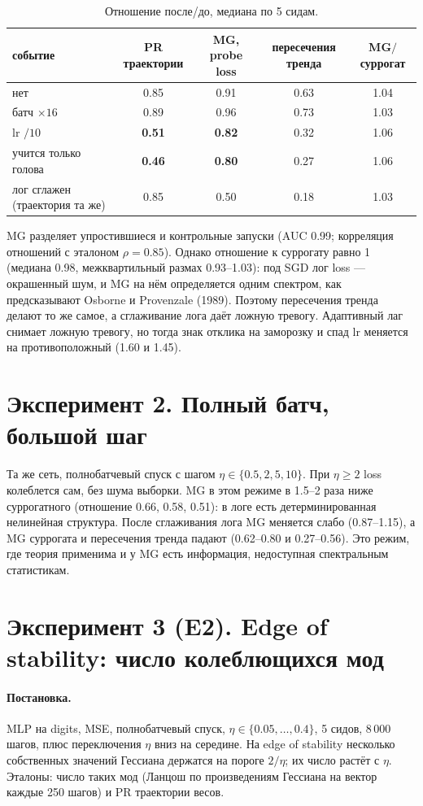 \documentclass[10pt,a4paper]{article}
\newcommand{\bad}[1]{\textcolor[HTML]{BB5566}{#1}}
\begin{document}
\begin{table}[h]\centering\small
\begin{tabular}{lcccc}\toprule
событие & PR траектории & MG, probe loss & пересечения тренда & MG$/$суррогат\\\midrule
нет & 0.85 & 0.91 & 0.63 & 1.04\\
батч $\times16$ & 0.89 & 0.96 & 0.73 & 1.03\\
lr $/10$ & \textbf{0.51} & \textbf{0.82} & 0.32 & 1.06\\
учится только голова & \textbf{0.46} & \textbf{0.80} & 0.27 & 1.06\\
лог сглажен (траектория та же) & 0.85 & \bad{0.50} & 0.18 & 1.03\\
\bottomrule\end{tabular}
\caption{Отношение после/до, медиана по 5 сидам.}\end{table}

MG разделяет упростившиеся и контрольные запуски (AUC 0.99; корреляция отношений с
эталоном $\rho=0.85$). Однако отношение к суррогату равно 1 (медиана 0.98,
межквартильный размах 0.93--1.03): под SGD лог loss --- окрашенный шум, и MG на нём
определяется одним спектром, как предсказывают Osborne и Provenzale (1989). Поэтому
пересечения тренда делают то же самое, а сглаживание лога даёт ложную тревогу.
Адаптивный лаг снимает ложную тревогу, но тогда знак отклика на заморозку и спад
lr меняется на противоположный (1.60 и 1.45).

\section{Эксперимент 2. Полный батч, большой шаг}

Та же сеть, полнобатчевый спуск с шагом $\eta\in\{0.5,2,5,10\}$. При $\eta\geq 2$ loss
колеблется сам, без шума выборки. MG в этом режиме в 1.5--2 раза ниже суррогатного
(отношение 0.66, 0.58, 0.51): в логе есть детерминированная нелинейная структура.
После сглаживания лога MG меняется слабо (0.87--1.15), а MG суррогата и пересечения
тренда падают (0.62--0.80 и 0.27--0.56). Это режим, где теория применима и у MG есть
информация, недоступная спектральным статистикам.

\section{Эксперимент 3 (E2). Edge of stability: число колеблющихся мод}

\paragraph{Постановка.} MLP на digits, MSE, полнобатчевый спуск,
$\eta\in\{0.05,\dots,0.4\}$, 5 сидов, 8\,000 шагов, плюс переключения $\eta$ вниз на
середине. На edge of stability несколько собственных значений Гессиана держатся на
пороге $2/\eta$; их число растёт с $\eta$. Эталоны: число таких мод (Ланцош по
произведениям Гессиана на вектор каждые 250 шагов) и PR траектории весов.
\end{document}
